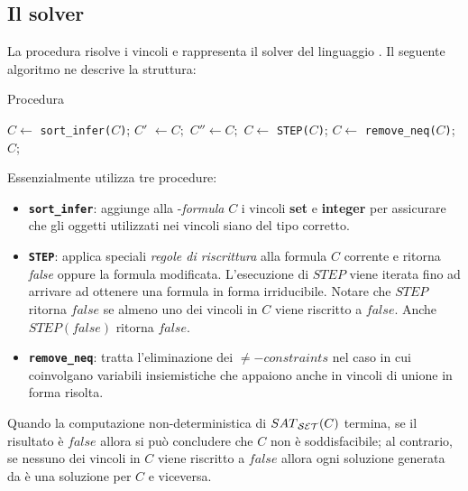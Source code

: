 \documentclass[12pt,a4paper,openright]{book} %
\begin{document}
\subsection{Il solver \satset{}}
\label{subsec:clpbasedlang_lset_solver}

La procedura \satset{} risolve i vincoli e rappresenta il solver del linguaggio \lset{}. Il seguente algoritmo ne descrive la struttura:

\begin{algorithm}
	\caption{Procedura \satset{}}
	\begin{algorithmic}[1]
		\State $C \gets $ \texttt{sort\_infer($C$)};
		\Repeat
		\State $C'$ $\gets C;$
		\Repeat
		\State $C'' \gets C;$
		\State $C \gets $ \texttt{STEP($C$)};
		\State $C \gets $ \texttt{remove\_neq($C$)};
		\State
		\State\Return $C$;
		\EndProcedure
	\end{algorithmic}
	\label{alg:pseudo_satset}
\end{algorithm}

Essenzialmente  utilizza tre procedure:

\begin{itemize}
	\item \textbf{\texttt{sort\_infer}}: aggiunge alla \calset{}-\textit{formula} $C$ i vincoli \textbf{set} e \textbf{integer} per assicurare che gli oggetti utilizzati nei vincoli siano del tipo corretto.
	
	\item \textbf{\texttt{STEP}}: applica speciali \textit{regole di riscrittura} alla formula $C$ corrente e ritorna \textit{false} oppure la formula modificata. L'esecuzione di $STEP$ viene iterata fino ad arrivare ad ottenere una formula in forma irriducibile. Notare che $STEP$ ritorna $false$ se almeno uno dei vincoli in $C$ viene riscritto a $false$. Anche $STEP(false)$ ritorna $false$.
	
	\item \textbf{\texttt{remove\_neq}}: tratta l'eliminazione dei $\neq-constraints$ nel caso in cui coinvolgano variabili insiemistiche che appaiono anche in vincoli di unione in forma risolta.
\end{itemize}

Quando la computazione non-deterministica di $SAT\textsubscript{\ensuremath{\mathcal{S}}\ensuremath{\mathcal{E}}\ensuremath{\mathcal{T}}}{}(C)$ termina, se il risultato è $false$ allora si può concludere che $C$ non è soddisfacibile; al contrario, se nessuno dei vincoli in $C$ viene riscritto a $false$ allora ogni soluzione generata da \satset{} è una soluzione per $C$ e viceversa.
\end{document}

